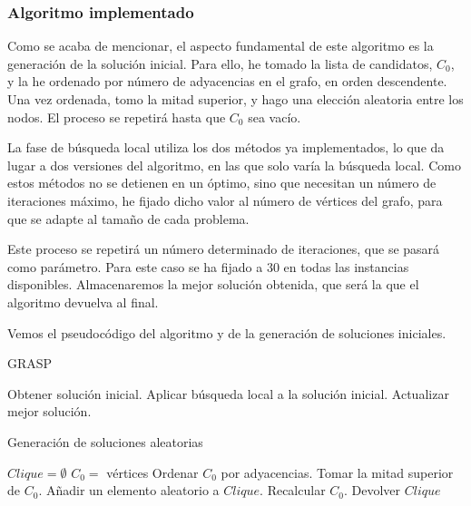 \subsubsection{Algoritmo implementado}

Como se acaba de mencionar, el aspecto fundamental de este algoritmo es la generación de la solución inicial.
Para ello, he tomado la lista de candidatos, $C_0$, y la he ordenado por número de adyacencias en el grafo,
en orden descendente. Una vez ordenada, tomo la mitad superior, y hago una elección aleatoria entre los nodos.
El proceso se repetirá hasta que $C_0$ sea vacío.

La fase de búsqueda local utiliza los dos métodos ya implementados, lo que da lugar a dos versiones del algoritmo,
en las que solo varía la búsqueda local. Como estos métodos no se detienen en un óptimo, sino que necesitan
un número de iteraciones máximo, he fijado dicho valor al número de vértices del grafo, para que se adapte
al tamaño de cada problema.

Este proceso se repetirá un número determinado de iteraciones, que se pasará como parámetro. Para este caso
se ha fijado a $30$ en todas las instancias disponibles. Almacenaremos la mejor solución obtenida, que será
la que el algoritmo devuelva al final.

Vemos el pseudocódigo del algoritmo y de la generación de soluciones iniciales.

\begin{algorithm}[H]
\caption{GRASP}
  \begin{algorithmic}
  \Repeat
    \State Obtener solución inicial.
    \State Aplicar búsqueda local a la solución inicial.
    \State Actualizar mejor solución.
  \end{algorithmic}
\end{algorithm}

\begin{algorithm}[H]
\caption{Generación de soluciones aleatorias}
  \begin{algorithmic}
    \State $Clique = \emptyset$
    \State $C_0 =$ vértices
    \Repeat
      \State Ordenar $C_0$ por adyacencias.
      \State Tomar la mitad superior de $C_0$.
      \State Añadir un elemento aleatorio a $Clique$.
      \State Recalcular $C_0$.
    \State Devolver $Clique$
  \end{algorithmic}
\end{algorithm}


